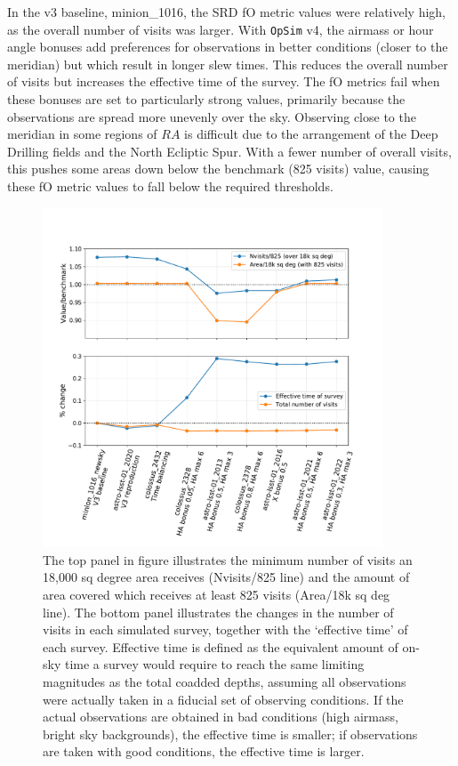 \documentclass[DM,lsstdraft,authoryear,toc]{lsstdoc}
\newcommand{\opsim}{\texttt{OpSim}\xspace}
\begin{document}
In the v3 baseline, minion\_1016, the SRD fO metric values were relatively high, as the overall number of visits was larger. With \opsim v4, the airmass or hour angle bonuses add preferences for observations in better conditions (closer to the meridian) but which result in longer slew times. This reduces the overall number of visits but increases the effective time of the survey. The fO metrics fail when these bonuses are set to particularly strong values, primarily because the observations are spread more unevenly over the sky. Observing close to the meridian in some regions of $RA$ is difficult due to the arrangement of the Deep Drilling fields and the North Ecliptic Spur. With a fewer number of overall visits, this pushes some areas down below the benchmark (825 visits) value, causing these fO metric values to fall below the required thresholds. 

\begin{figure}[ht]
\centering
\includegraphics[width=0.9\textwidth]{figures/srd}
\caption{The top panel in figure illustrates the minimum number of visits an 18,000 sq degree area receives (Nvisits/825 line) and the amount of area covered which receives at least 825 visits (Area/18k sq deg line).  The bottom panel illustrates the changes in the number of visits in each simulated survey, together with the `effective time' of each survey. Effective time is defined as the equivalent amount of on-sky time a survey would require to reach the same limiting magnitudes as the total coadded depths, assuming all observations were actually taken in a fiducial set of observing conditions. If the actual observations are obtained in bad conditions (high airmass, bright sky backgrounds), the effective time is smaller; if observations are taken with good conditions, the effective time is larger.
\label{fig:srd}}
\end{figure}
\end{document}
